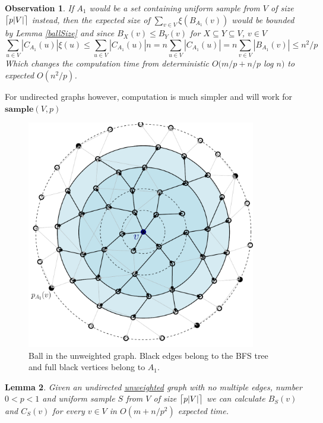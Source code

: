 \documentclass[shortabstract, lic, english]{iithesis}
\theoremstyle{definition} \newtheorem{definition}{Definition}[chapter]
\theoremstyle{plain} \newtheorem{remark}[definition]{Observation}
\theoremstyle{plain} \newtheorem{theorem}[definition]{Theorem}
\theoremstyle{plain} \newtheorem{lemma}[definition]{Lemma}
\theoremstyle{plain} \newtheorem{conjecture}[definition]{Conjecture}
\DeclarePairedDelimiter{\ceil}{\lceil}{\rceil}
\begin{document}
\begin{remark} \label{ballClustersForUniformSample}
    If $A_1$ would be a set containing uniform sample from $V$ of size $\ceil[\big]{p  |V|}$ instead, then the expected size of $\sum_{v \in V} \xi(B_{A_1}(v))$ would be bounded by Lemma \ref{ballSize} and since $B_X(v) \leq B_Y(v)$ for $X \subseteq Y \subseteq V$, $v \in V$
    $$\sum_{u \in V} |C_{A_1}(u)|\xi(u) \leq \sum_{u \in V} |C_{A_1}(u)|  n = n  \sum_{u \in V} |C_{A_1}(u)| = n  \sum_{v \in V} |B_{A_1}(v)| \leq n^2/p$$
    Which changes the computation time from deterministic $O(m/p + n/p $ log $n) $ to expected $O(n^2/p)$.
\end{remark}

For undirected graphs however, computation is much simpler and will work for
$\mathbf{sample}(V, p)$

\begin{figure}[h]
    \includegraphics[width=10cm]{images/ball_computation}
    \centering
    \caption{Ball in the unweighted graph. Black edges belong to the BFS tree and full black vertices belong to $A_1$.}
\end{figure}

\begin{lemma} \label{ballClusterUnweighted}
    Given an undirected \underline{unweighted} graph with no multiple edges, number $0 < p < 1$ and
    uniform sample $S$ from $V$ of size $\ceil[\big]{p  |V|}$
    we can calculate $B_{S}(v)$ and $C_{S}(v)$ for every $v \in V$ in $O(m + n/p^2)$ expected time.
\end{lemma}
\end{document}
